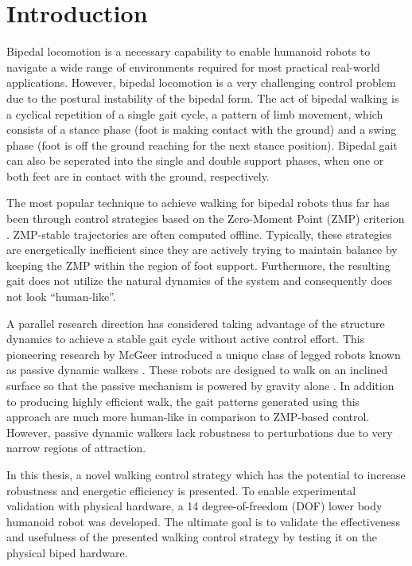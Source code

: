 \chapter{Introduction} %
\label{cha:introduction}
Bipedal locomotion is a necessary capability to enable humanoid robots to navigate a wide range of environments required for most practical real-world applications. However, bipedal locomotion is a very challenging control problem due to the postural instability of the bipedal form. The act of bipedal walking is a cyclical repetition of a single gait cycle, a pattern of limb movement, which consists of a stance phase (foot is making contact with the ground) and a swing phase (foot is off the ground reaching for the next stance position). Bipedal gait can also be seperated into the single and double support phases, when one or both feet are in contact with the ground, respectively. 

The most popular technique to achieve walking for bipedal robots thus far has been through control strategies based on the Zero-Moment Point (ZMP) criterion \cite{Vukobratovic:2004wy}. ZMP-stable trajectories are often computed offline. Typically, these strategies \cite{Kajita:1997vr,Sugihara:2002kq} are energetically inefficient since they are actively trying to maintain balance by keeping the ZMP within the region of foot support. Furthermore, the resulting gait does not utilize the natural dynamics of the system and consequently does not look ``human-like''. 

A parallel research direction has considered taking advantage of the structure dynamics to achieve a stable gait cycle without active control effort. This pioneering research by McGeer \cite{McGeer:1990uk} introduced a unique class of legged robots known as passive dynamic walkers \cite{Collins:2005vp}. These robots are designed to walk on an inclined surface so that the passive mechanism is powered by gravity alone \cite{Spong:1999vk}. In addition to producing highly efficient walk, the gait patterns generated using this approach are much more human-like in comparison to ZMP-based control. However, passive dynamic walkers lack robustness to perturbations due to very narrow regions of attraction. 

In this thesis, a novel walking control strategy which has the potential to increase robustness and energetic efficiency is presented. To enable experimental validation with physical hardware, a 14 degree-of-freedom (DOF) lower body humanoid robot was developed. The ultimate goal is to validate the effectiveness and usefulness of the presented walking control strategy by testing it on the physical biped hardware. 

